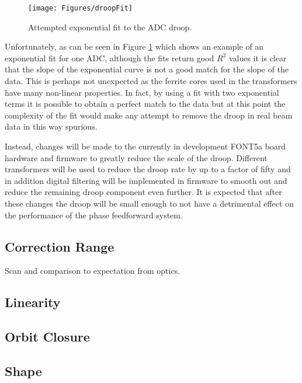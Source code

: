 \begin{figure}
  \centering
  \texttt{[image: Figures/droopFit]}
  \caption{Attempted exponential fit to the ADC droop.}
  \label{f:droopFit}
\end{figure}

Unfortunately, as can be seen in Figure \ref{f:droopFit} which shows an example of an exponential fit for one ADC, although the fits return good \(R^{2}\) values it is clear that the slope of the exponential curve is not a good match for the slope of the data. This is perhaps not unexpected as the ferrite cores used in the transformers have many non-linear properties. In fact, by using a fit with two exponential terms it is possible to obtain a perfect match to the data but at this point the complexity of the fit would make any attempt to remove the droop in real beam data in this way spurious.

Instead, changes will be made to the currently in development FONT5a board hardware and firmware to greatly reduce the scale of the droop. Different transformers will be used to reduce the droop rate by up to a factor of fifty and in addition digital filtering will be implemented in firmware to smooth out and reduce the remaining droop component even further. It is expected that after these changes the droop will be small enough to not have a detrimental effect on the performance of the phase feedforward system. 




\subsection{Correction Range}
\label{ss:corrRange}


Scan and comparison to expectation from optics.

\subsection{Linearity}
\label{ss:kickLin}

\subsection{Orbit Closure}
\label{ss:orbitClosure}

\subsection{Shape}
\label{ss:kickShape}

